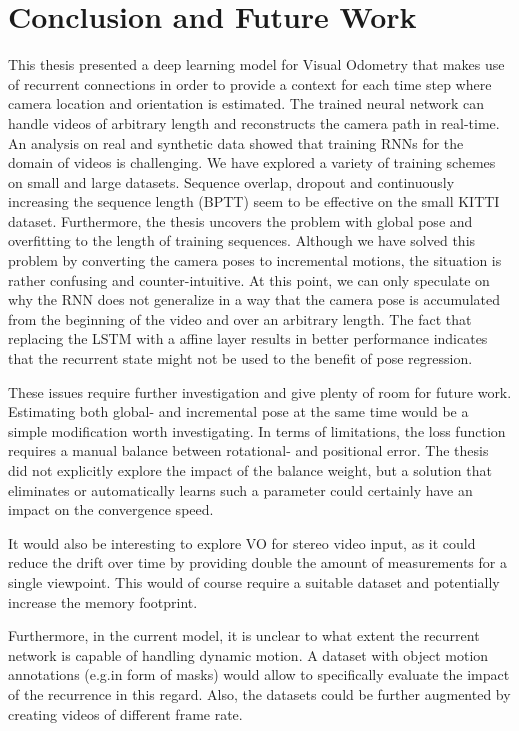 \chapter{Conclusion and Future Work}

This thesis presented a deep learning model for Visual Odometry that makes use of recurrent connections in order to provide a context for each time step where camera location and orientation is estimated.
The trained neural network can handle videos of arbitrary length and reconstructs the camera path in real-time.
An analysis on real and synthetic data showed that training RNNs for the domain of videos is challenging.
We have explored a variety of training schemes on small and large datasets.
Sequence overlap, dropout and continuously increasing the sequence length (BPTT) seem to be effective on the small KITTI dataset.
Furthermore, the thesis uncovers the problem with global pose and overfitting to the length of training sequences.
Although we have solved this problem by converting the camera poses to incremental motions, the situation is rather confusing and counter-intuitive.
At this point, we can only speculate on why the RNN does not generalize in a way that the camera pose is accumulated from the beginning of the video and over an arbitrary length.
The fact that replacing the LSTM with a affine layer results in better performance indicates that the recurrent state might not be used to the benefit of pose regression.

These issues require further investigation and give plenty of room for future work.
Estimating both global- and incremental pose at the same time would be a simple modification worth investigating.
In terms of limitations, the loss function requires a manual balance between rotational- and positional error.
The thesis did not explicitly explore the impact of the balance weight, but a solution that eliminates or automatically learns such a parameter could certainly have an impact on the convergence speed.

It would also be interesting to explore VO for stereo video input, as it could reduce the drift over time by providing double the amount of measurements for a single viewpoint.
This would of course require a suitable dataset and potentially increase the memory footprint.

Furthermore, in the current model, it is unclear to what extent the recurrent network is capable of handling dynamic motion. 
A dataset with object motion annotations (e.g.\@ in form of masks) would allow to specifically evaluate the impact of the recurrence in this regard.
Also, the datasets could be further augmented by creating videos of different frame rate.

